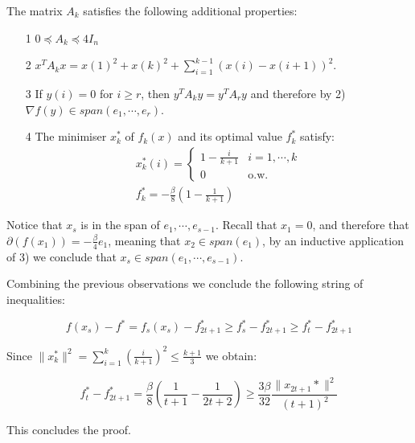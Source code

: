 The matrix $A_k$ satisfies the following additional properties:
\begin{itemize}
\item[1] $0 \preceq A_k \preceq 4I_n$
\item[2] $x^TA_kx = x(1)^2 + x(k)^2 + \sum_{i=1}^{k-1} (x(i)-x(i+1))^2$.
\item[3] If $y(i) = 0$ for $i \geq r$, then $y^T A_{k} y = y^TA_{r}y$ and therefore by 2) $\nabla f(y) \in span(e_1, \cdots, e_{r})$. 
\item[4] The minimiser $x_k^*$ of $f_k(x)$ and its optimal value $f_k^*$ satisfy:
    \begin{align}
        x_k^*(i) = \begin{cases}
                    1-\frac{i}{k+1} & i = 1, \cdots, k \\
                    0 & \text{o.w.}
                    \end{cases}\\
        f_k^* = -\frac{\beta}{8}\left( 1-\frac{1}{k+1}\right)
    \end{align}
\end{itemize}


Notice that $x_s$ is in the span of $e_1, \cdots, e_{s-1}$.  Recall that $x_1 = 0$, and therefore that $\partial(f(x_1)) = -\frac{\beta}{4}e_1$, meaning that $x_2 \in span(e_1)$, by an inductive application of 3) we conclude that $x_s \in span(e_1, \cdots, e_{s-1})$. 

Combining the previous observations we conclude the following string of inequalities:

\begin{equation}
f(x_s) - f^* = f_s(x_s) - f_{2t+1}^* \geq f_s^* - f^*_{2t+1} \geq f_t^* - f_{2t+1}^*
\end{equation}

Since $\parallel x_k^* \parallel^2 = \sum_{i=1}^k \left( \frac{i}{k+1}\right)^2 \leq \frac{k+1}{3}$ we obtain:

\begin{equation}
f_t^* - f_{2t+1}^* =\frac{\beta}{8}\left( \frac{1}{t+1} - \frac{1}{2t+2}\right) \geq \frac{3\beta}{32} \frac{\parallel x_{2t+1}*\parallel^2}{(t+1)^2}
\end{equation}

This concludes the proof. 

\proofend


